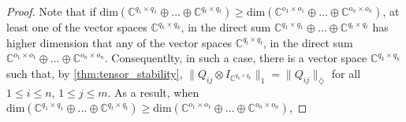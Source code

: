 \begin{proof}
  Note that if  $\text{dim}(\mathbb{C}^{q_1 \times q_1} \oplus \ldots \oplus \mathbb{C}^{q_t \times q_t}) \geq  \text{dim}(\mathbb{C}^{o_1 \times o_1} \oplus \ldots \oplus \mathbb{C}^{o_n \times o_n})$, at least one of the vector spaces ${\mathbb{C}^{q_k \times q_k}}$, in the direct sum $\mathbb{C}^{q_1 \times q_1} \oplus \ldots \oplus \mathbb{C}^{q_t \times q_t}$ has higher dimension that any of the vector spaces ${\mathbb{C}^{q_l \times q_l}}$, in the direct sum $\mathbb{C}^{o_1 \times o_1} \oplus \ldots \oplus \mathbb{C}^{o_n \times o_n}$. Consequentlty, in such a case, there is a vector space $\mathbb{C}^{q_k \times q_k}$ such that, by \autoref{thm:tensor_stability},  $ \lVert Q_{ij} \otimes I_{\mathbb{C}^{q_k \times q_k}} \rVert_1 = {\|Q_{ij}\|_{\diamondsuit}}$ for all $1\leq i \leq n$, $1 \leq j \leq m$. As a result, when $\text{dim}(\mathbb{C}^{q_1 \times q_1} \oplus \ldots \oplus \mathbb{C}^{q_t \times q_t}) \geq  \text{dim}(\mathbb{C}^{o_1 \times o_1} \oplus \ldots \oplus \mathbb{C}^{o_n \times o_n})$,
  

\end{proof}
